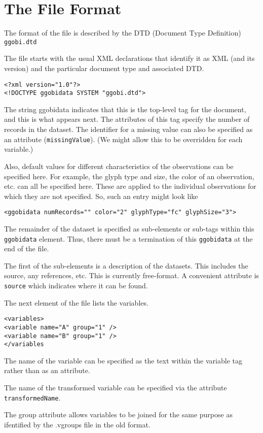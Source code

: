 \documentclass{article}
\begin{document}
\section{The File Format}
The format of the file is described by the 
DTD (Document Type Definition) 
\texttt{ggobi.dtd}

The file starts with the usual XML
declarations that identify it as XML
(and its version)
and the particular document type
and associated DTD.
\begin{verbatim}
<?xml version="1.0"?>
<!DOCTYPE ggobidata SYSTEM "ggobi.dtd">
\end{verbatim}
The string ggobidata indicates that this is the top-level tag for the
document, and this is what appears next.  The attributes of this tag
specify the number of records in the dataset.  The identifier for a
missing value can also be specified as an attribute
(\texttt{missingValue}). (We might allow this to be overridden for
each variable.)

Also, default values for different characteristics of the observations
can be specified here.  For example, the glyph type and size, the
color of an observation, etc. can all be specified here.  These are
applied to the individual observations for which they are not
specified.  So, such an entry might look like
\begin{verbatim}
<ggobidata numRecords="" color="2" glyphType="fc" glyphSize="3">
\end{verbatim}
The remainder of the dataset is specified as sub-elements or sub-tags
within this \texttt{ggobidata} element.  Thus, there must be a
termination of this \texttt{ggobidata} at the end of the file.

The first of the sub-elements is a description of the datasets.  This
includes the source, any references, etc.  This is currently
free-format.  A convenient attribute is \texttt{source} which
indicates where it can be found.

The next element of the file 
lists the variables.
\begin{verbatim}
<variables>
<variable name="A" group="1" />
<variable name="B" group="1" />
</variables
\end{verbatim}
The name of the variable
can be specified as the text within the
variable tag rather than as an attribute.

The name of the transformed variable can be specified via the
attribute \texttt{transformedName}.

The group attribute allows variables to be joined for the same purpose
as ifentified by the .vgroups file in the old format.
\end{document}
